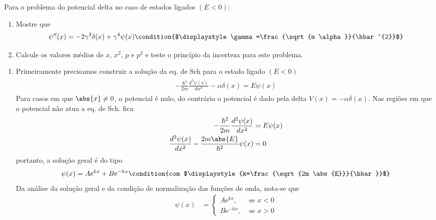 \begin{prob}
	Para o problema do potencial delta no caso de estados ligados $(E<0)$:
	\begin{enumerate}[label=\alph *)]
		\item Mostre que
			\begin{dmath*}
				\psi^{\prime\prime}(x) = -2 \gamma^{3} \delta(x)+\gamma^{4} \psi(x)\condition{$\displaystyle \gamma=\frac{\sqrt{m \alpha}}{\hbar^{2}}$} 
			\end{dmath*}
		\item Calcule os valores médios de $x$, $x^{2}$, $p$ e $p^{2}$ e teste o princípio da incerteza para este problema.
	\end{enumerate}

	\begin{sol}
		\begin{enumerate}[label=\alph *)]
				\item Primeiramente precisamos construir a solução da eq. de Sch para o estado ligado $(E<0)$
					\begin{align}
							\begin{split}
								-\frac{\hbar^{2}}{2m}\frac{d^{2}\psi(x)}{dx^{2}} -\alpha \delta(x)=E \psi(x) \label{eq:p09-eq01}
							\end{split}
					\end{align}
					Para casos em que $\abs{x}\neq 0$, o potencial é nulo, do contrário o potencial é dado pela delta $V(x)=-\alpha \delta(x)$. Nas regiões em que o potencial não atua a eq. de Sch. fica
					\begin{align}
							\begin{split}
								-\frac{\hbar^{2}}{2m}\frac{d^{2} \psi(x)}{dx^{2}} &= E \psi(x)\\
								\frac{d^{2} \psi(x)}{dx^{2}}-\frac{2m \abs{E}}{\hbar^{2}} \psi(x) &= 0
							\end{split}
					\end{align}
					portanto, a solução geral é do tipo
					\begin{dmath*}
						\psi(x)=A \mathrm{e}^{kx}+B \mathrm{e}^{-kx}\condition{com $\displaystyle{k=\frac{\sqrt{2m \abs{E}}}{\hbar}}$}
					\end{dmath*}
					Da análise da solução geral e da condição de normalização das funções de onda, nota-se que
					\begin{align}
						\psi(x) &=
						\begin{cases}
							A \mathrm{e}^{kx}, &\text{ se }x<0\\
							B \mathrm{e}^{-kx}, &\text{ se }x>0

\end{cases}
\end{align}
\end{enumerate}
\end{sol}
\end{prob}
